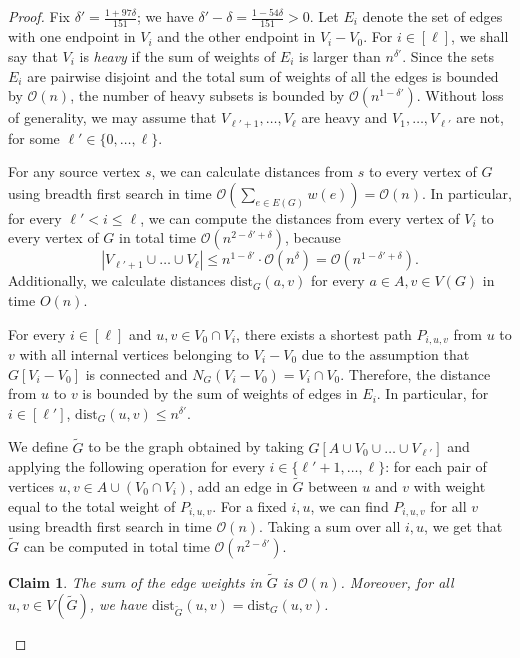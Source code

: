 \documentclass[11pt,a4paper]{article}
\newtheorem{claim}{Claim}[section]
\newcommand{\Oh}{\mathcal{O}}
\newcommand{\dist}{\mathrm{dist}}
\renewcommand{\leq}{\leqslant}
\renewcommand{\setminus}{-}
\begin{document}
\begin{proof}
Fix $\delta' = \frac{1 + 97 \delta}{151}$; we have $\delta' - \delta = \frac{1 - 54\delta}{151} > 0$.
Let $E_i$ denote the set of edges with one endpoint in $V_i$ and the other endpoint in $V_i \setminus V_0$. For $i \in [\ell]$, we shall say that $V_i$ is {\em{heavy}} if the sum of weights of $E_i$ is larger than $n^{\delta'}$. Since the sets $E_i$ are pairwise disjoint and the total sum of weights of all the edges is bounded by $\Oh(n)$, the number of heavy subsets is bounded by $\Oh(n^{1 - \delta'})$. Without loss of generality, we may assume that $V_{\ell' + 1}, \dots, V_\ell$ are heavy and $V_1, \dots, V_{\ell'}$ are not, for some $\ell'\in \{0,\ldots,\ell\}$.


For any source vertex $s$, we can calculate distances from $s$ to every vertex of $G$  using breadth first search in time $\Oh(\sum_{e \in E(G)} w(e)) = \Oh(n)$.
In particular, for every $\ell' < i \leq \ell$, we can compute the distances from every vertex of $V_i$ to every vertex of $G$ in total time $\Oh(n^{2 - \delta' + \delta})$, because $$|V_{\ell'+1}\cup \ldots\cup V_{\ell}|\leq n^{1-\delta'}\cdot \Oh(n^\delta)=\Oh(n^{1-\delta'+
\delta}).$$
Additionally, we calculate distances $\dist_G(a, v)$ for every $a \in A, v \in V(G)$ in time $O(n)$.

For every $i \in [\ell]$ and $u,v \in V_0 \cap V_i$, there exists a shortest path $P_{i,u,v}$ from $u$ to $v$ with all internal vertices belonging to $V_i - V_0$ due to the assumption that $G[V_i - V_0]$ is connected and $N_G(V_i - V_0) = V_i \cap V_0$. Therefore, the distance from $u$ to $v$ is bounded by the sum of weights of edges in $E_i$. In particular, for $i \in [\ell']$, $\dist_G(u, v) \leq n^{\delta'}$.

We define $\widetilde{G}$ to be the graph obtained by taking $G[A \cup V_0 \cup \dots \cup V_{\ell'}]$ and applying the following operation for every $i \in \{\ell' + 1, \dots, \ell\}$:
for each pair of vertices $u, v \in A \cup (V_0 \cap V_i)$, add an edge in $\widetilde{G}$ between $u$ and $v$ with weight equal to the total weight of $P_{i,u,v}$. For a fixed $i, u$, we can find $P_{i, u, v}$ for all $v$ using breadth first search in time $\Oh(n)$. Taking a sum over all $i, u$, we get that $\tilde{G}$ can be computed in total time $\Oh(n^{2 - \delta'})$.


\begin{claim}\label{cl:wG}
The sum of the edge weights in $\widetilde{G}$ is $\Oh(n)$. Moreover, for all $u, v \in V(\widetilde{G})$, we have $\dist_{\widetilde{G}}(u, v) = \dist_{G}(u, v)$.
\end{claim}


\end{proof}
\end{document}
